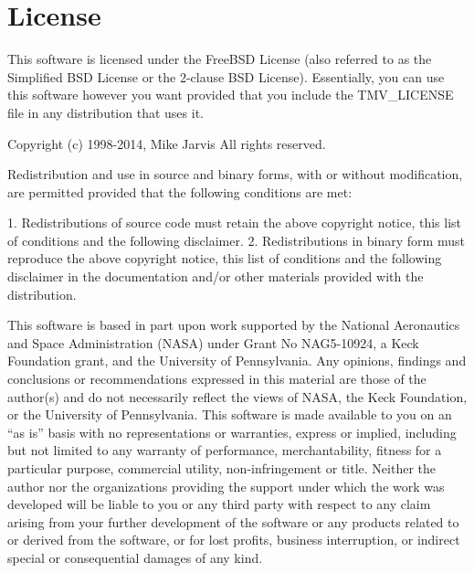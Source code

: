 
\section{License}
\label{License}

This software is licensed under the FreeBSD License (also referred to as the 
Simplified BSD License or the 2-clause BSD License).
Essentially, you can use this software however you want provided that
you include the TMV\_LICENSE file in any distribution that uses it.

Copyright (c) 1998-2014, Mike Jarvis
All rights reserved.

Redistribution and use in source and binary forms, with or without
modification, are permitted provided that the following conditions are met: 

1. Redistributions of source code must retain the above copyright notice, this
   list of conditions and the following disclaimer. 
2. Redistributions in binary form must reproduce the above copyright notice,
   this list of conditions and the following disclaimer in the documentation
   and/or other materials provided with the distribution. 

This software is based in part upon work supported by the 
National Aeronautics and Space Administration (NASA) under Grant No 
NAG5-10924, a Keck Foundation grant, and the University of Pennsylvania. 
Any opinions, findings and conclusions or recommendations expressed in this 
material are those of the author(s) and do not necessarily reflect the views 
of NASA, the Keck Foundation, or the University of Pennsylvania.
This software is made available to you on an ``as is'' basis with no 
representations or warranties, express or implied, including but not 
limited to any warranty of performance, merchantability, fitness for a 
particular purpose, commercial utility, non-infringement or title.  
Neither the author nor the organizations providing the support under 
which the work was developed will be liable to you or any third party 
with respect to any claim arising from your further development of the 
software or any products related to or derived from the software, or for 
lost profits, business interruption, or indirect special or consequential 
damages of any kind. 


